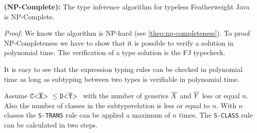 \begin{theoremAndi}
  \label{theo:np-completeness}
  \textbf{(NP-Complete):}
  The type inference algorithm for typeless Featherweight Java is NP-Complete.
\end{theoremAndi}

\textit{Proof:} We know the algorithm is NP-hard (see \ref{theo:np-completeness}).
To proof NP-Completeness we have to show that it is possible to verify a solution in polynomial time.
The verification of a type solution is the FJ typecheck.

It is easy to see that the expression typing rules can be checked in polynomial time as long as subtyping between two types is verifiable in polynomial time.

Assume $\mathtt{C {\tt <} \overline{X} {\tt >} \ } \leq \mathtt{D {\tt <} \overline{Y} {\tt >} \ }$ with the number of generics $\overline{X}$ and $\overline{Y}$ less or equal $n$.
Also the number of classes in the subtyperelation is less or equal to $n$.
With $n$ classes the \texttt{S-TRANS} rule can be applied a maximum of $n$ times.
The \texttt{S-CLASS} rule can be calculated in two steps.

